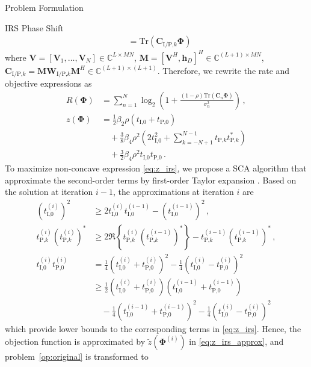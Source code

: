 \documentclass[journal]{IEEEtran}
\begin{document}
\begin{section}{Problem Formulation}
\begin{subsection}{IRS Phase Shift}
\begin{align}
				& = \mathrm{Tr}(\boldsymbol{C}_{\text{I/P,}k}\boldsymbol{\Phi})
			\end{align}
			where $\boldsymbol{V}=[\boldsymbol{V}_1,\dots,\boldsymbol{V}_N] \in \mathbb{C}^{L \times MN}$, $\boldsymbol{M}=[\boldsymbol{V}^H, \boldsymbol{h}_{D}]^H \in \mathbb{C}^{(L+1) \times MN}$, $\boldsymbol{C}_{\text{I/P,}k}=\boldsymbol{M}\boldsymbol{W}_{\text{I/P,}k}\boldsymbol{M}^H \in \mathbb{C}^{(L+1)\times(L+1)}$. Therefore, we rewrite the rate and objective expressions as
			\begin{align}
				R(\boldsymbol{\Phi})
				& = \sum_{n=1}^{N}{\log_2\left(1+\frac{(1-\rho)\mathrm{Tr}(\boldsymbol{C}_n\boldsymbol{\Phi})}{\sigma_n^2}\right)}\,,\label{eq:R_irs}\\
				z(\boldsymbol{\Phi})
				& = \frac{1}{2}{\beta_2}{\rho}(t_{\text{I,}0}+t_{\text{P,}0})\nonumber\\
				& \quad + \frac{3}{8}{\beta_4}{\rho^2} \left(2t_{\text{I,}0}^2 + \sum_{k=-N+1}^{N-1}{t_{\text{P,}k}t_{\text{P,}k}^*}\right)\nonumber\\
				& \quad + \frac{3}{2}{\beta_4}{\rho^2}t_{\text{I,}0}t_{\text{P,}0}\,.\label{eq:z_irs}
			\end{align}
			To maximize non-concave expression \eqref{eq:z_irs}, we propose a SCA algorithm that approximate the second-order terms by first-order Taylor expansion \cite{Adali2010}. Based on the solution at iteration $i - 1$, the approximations at iteration $i$ are
			\begin{align}
				(t_{\text{I,}0}^{(i)})^2
				& \ge 2 t_{\text{I,}0}^{(i)}t_{\text{I,}0}^{(i-1)} - (t_{\text{I,}0}^{(i-1)})^2\,,\label{eq:taylor_1}\\
				t_{\text{P,}k}^{(i)} (t_{\text{P,}k}^{(i)})^*
				& \ge 2 \Re\left\{t_{\text{P,}k}^{(i)} (t_{\text{P,}k}^{(i-1)})^*\right\} - t_{\text{P,}k}^{(i-1)} (t_{\text{P,}k}^{(i-1)})^*\,,\label{eq:taylor_2}\\
				t_{\text{I,}0}^{(i)} t_{\text{P,}0}^{(i)}
				& = \frac{1}{4}(t_{\text{I,}0}^{(i)} + t_{\text{P,}0}^{(i)})^2 - \frac{1}{4}(t_{\text{I,}0}^{(i)} - t_{\text{P,}0}^{(i)})^2\nonumber\\
				& \ge \frac{1}{2}(t_{\text{I,}0}^{(i)} + t_{\text{P,}0}^{(i)})(t_{\text{I,}0}^{(i-1)} + t_{\text{P,}0}^{(i-1)})\nonumber\\
				& \quad - \frac{1}{4}(t_{\text{I,}0}^{(i-1)} + t_{\text{P,}0}^{(i-1)})^2 - \frac{1}{4}(t_{\text{I,}0}^{(i)} - t_{\text{P,}0}^{(i)})^2\label{eq:taylor_3}
			\end{align}
			which provide lower bounds to the corresponding terms in \eqref{eq:z_irs}. Hence, the objection function is approximated by $\tilde{z}(\boldsymbol{\Phi}^{(i)})$ in \eqref{eq:z_irs_approx}, and problem~\eqref{op:original} is transformed to

\end{subsection}
\end{section}
\end{document}
